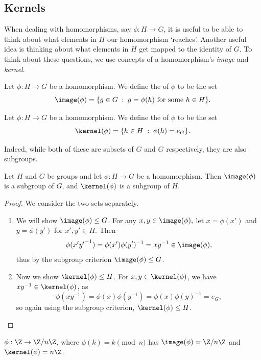 \documentclass[a4]{scrreprt}
\newcommand{\newsubsection}{\subsection}
\begin{document}
\newsubsection{Kernels}

When dealing with homomorphisms, say $\phi : H \rightarrow G$, it is useful to be able to think about what elements in $H$ our homomorphism `reaches'.
Another useful idea is thinking about what elements in $H$ get mapped to the identity of $G$. To think about these questions, we use concepts of a homomorphism's \emph{image} and \emph{kernel}. 

\begin{definition}[Image]
	Let $\phi :H \rightarrow G$ be a homomorphism. We define the  of $\phi$ to be the set
	$$
	\image(\phi) = \{ g \in G \; : \; g = \phi(h) \text{ for some } h \in H  \}.
	$$
\end{definition}
\begin{definition}[Kernel]
	Let $\phi : H \rightarrow G$ be a homomorphism. We define the  of $\phi$ to be the set
	$$
	\kernel(\phi) = \{ h \in H \; : \; \phi(h) = e_G \}.
	$$
\end{definition}

Indeed, while both of these are subsets of $G$ and $G$ respectively, they are also subgroups.

\begin{proposition}
	Let $H$ and $G$ be groups and let $\phi : H \rightarrow G$ be a homomorphism. Then $\image(\phi)$ is a subgroup of $G$, and $\kernel(\phi)$ is a subgroup of $H$.
\end{proposition}
\begin{proof}
	We consider the two sets separately.
	\begin{enumerate}
		\item We will show $\image(\phi) \leq G$. For any $x, y \in \image(\phi),$ let $x = \phi(x')$ and $y = \phi(y')$ for $x', y' \in H$. Then
		$$
		\phi(x' {y'}^{-1}) = \phi(x')\phi(y')^{-1} = x y^{-1} \in \image(\phi),
		$$
		thus by the subgroup criterion $\image(\phi) \leq G$.
		\item Now we show $\kernel(\phi) \leq H$. For $x, y \in \kernel(\phi)$, we have $xy^{-1} \in \kernel(\phi)$, as 
		$$
		\phi(xy^{-1}) = \phi(x)\phi(y^{-1}) = \phi(x)\phi(y)^{-1} = e_G,
		$$
		so again using the subgroup criterion, $\kernel(\phi) \leq H$. 
	\end{enumerate}
\end{proof}

\begin{example}
	$\phi : \Z \rightarrow \Z/n\Z$, where $\phi(k) = k \pmod{n}$ has $\image(\phi) = \Z/n\Z$ and $\kernel(\phi) = n\Z$.
\end{example}
\end{document}
